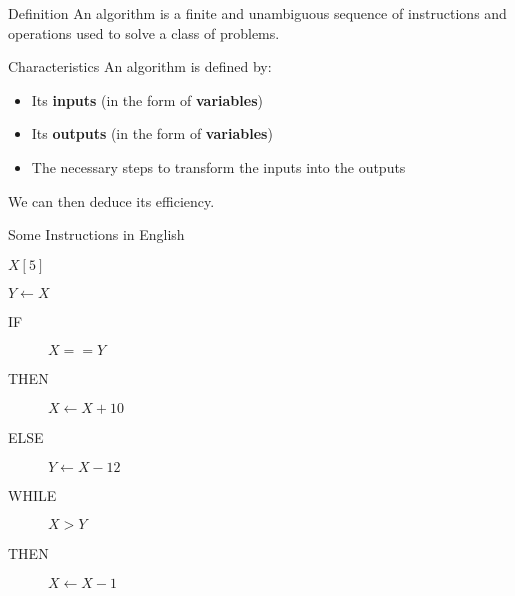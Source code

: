 \begin{frame}{Definition}
    An algorithm is a finite and unambiguous sequence of instructions and operations used to solve a class of problems.
    \end{frame}
    
    \begin{frame}{Characteristics}
    An algorithm is defined by:
    \begin{itemize}
    \item Its \textbf{inputs} (in the form of \textbf{variables})
    \item Its \textbf{outputs} (in the form of \textbf{variables})
    \item The necessary steps to transform the inputs into the outputs
    \end{itemize}
    We can then deduce its efficiency.
    \end{frame}
    
    \begin{frame}{Some Instructions in English}
    \begin{description}[<+->]
        \item [\blue{ACCESS}] $X[5]\;\;\;\;\;$ 
        \item []
        \item [\blue{ASSIGNMENT}] $Y \leftarrow X\;$  
        \item []
        \item [\blue{CONDITION}] 
        \begin{description}
            \item [IF] $X == Y$
            \item [THEN] $X \leftarrow X + 10$
            \item [ELSE] $Y \leftarrow X - 12$
        \end{description}
        \item []
        \item [\blue{LOOP}] 
        \begin{description}
            \item [WHILE] $X > Y$
            \item [THEN] $X \leftarrow X - 1$
        \end{description}
    \end{description}
    
    \end{frame}
    
